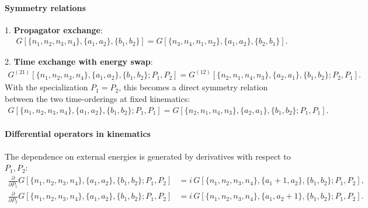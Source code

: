 \documentclass[a4paper,12pt]{article}
\begin{document}
\paragraph{Symmetry relations}
1. \textbf{Propagator exchange}:
\begin{align}
	G[\{n_1,n_2,n_3,n_4\},\{a_1,a_2\},\{b_1,b_2\}] = G[\{n_3,n_4,n_1,n_2\},\{a_1,a_2\},\{b_2,b_1\}].
\end{align}

2. \textbf{Time exchange with energy swap}:
\begin{align}
	G^{(21)}[\{n_1,n_2,n_3,n_4\},\{a_1,a_2\},\{b_1,b_2\}; P_1,P_2] = G^{(12)}[\{n_2,n_1,n_4,n_3\},\{a_2,a_1\},\{b_1,b_2\}; P_2,P_1].
\end{align}
With the specialization $P_1=P_2$, this becomes a direct symmetry relation between the two time-orderings at fixed kinematics:
\begin{align}
	G[\{n_1,n_2,n_3,n_4\},\{a_1,a_2\},\{b_1,b_2\}; P_1,P_1] = G[\{n_2,n_1,n_4,n_3\},\{a_2,a_1\},\{b_1,b_2\}; P_1,P_1].
\end{align}

\paragraph{Differential operators in kinematics}
The dependence on external energies is generated by derivatives with respect to $P_1,P_2$:
\begin{align}
	\frac{\partial}{\partial P_1}G[\{n_1,n_2,n_3,n_4\},\{a_1,a_2\},\{b_1,b_2\};P_1,P_2] &= i\,G[\{n_1,n_2,n_3,n_4\},\{a_1+1,a_2\},\{b_1,b_2\};P_1,P_2], \label{eq:GdP1}\\
	\frac{\partial}{\partial P_2}G[\{n_1,n_2,n_3,n_4\},\{a_1,a_2\},\{b_1,b_2\};P_1,P_2] &= i\,G[\{n_1,n_2,n_3,n_4\},\{a_1,a_2+1\},\{b_1,b_2\};P_1,P_2]. \label{eq:GdP2}
\end{align}
\end{document}
